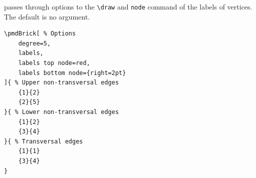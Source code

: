 \documentclass{ltxdoc}
\begin{document}
passes through options to the \verb`\draw` and \verb`node` command of the labels of vertices. The default is no argument.
\begin{center}
    \begin{minipage}{\dimexpr0.85\textwidth-2\fboxrule-2\fboxsep\relax}
        \begin{minipage}[c]{0.4\linewidth}
\begin{verbatim}
\pmdBrick[ % Options
    degree=5,
    labels,
    labels top node=red,
    labels bottom node={right=2pt}
]{ % Upper non-transversal edges
    {1}{2}
    {2}{5}
}{ % Lower non-transversal edges
    {1}{2}
    {3}{4}
}{ % Transversal edges
    {1}{1}
    {3}{4}
}
\end{verbatim}
        \end{minipage}
        \hfill
        \begin{minipage}[c]{0.4\linewidth}
        \end{minipage}
    \end{minipage}%
\end{center}
\begin{center}
\end{center}
\end{document}
